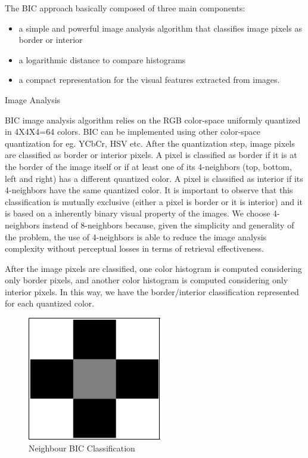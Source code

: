 The BIC approach basically composed of three main components:
\begin{itemize}
\item a simple and powerful image analysis algorithm that classifies image pixels as border or  interior

\item a logarithmic distance to compare histograms

\item a compact representation for the visual features extracted from images.

\end{itemize}
 

Image Analysis

 

BIC image analysis algorithm relies on the RGB color-space uniformly quantized in 4X4X4=64 colors. BIC can be implemented using other color-space quantization for eg. YCbCr, HSV etc. After the quantization step, image pixels are classified as border or interior pixels. A pixel is classified as border if it is at the border of the image itself or if at least one of its 4-neighbors (top, bottom, left and right) has a different quantized color. A pixel is classified as interior if its 4-neighbors have the same quantized color. It is important to observe that this classification is mutually exclusive (either a pixel is border or it is interior) and it is based on a inherently binary visual property of the images. We choose 4-neighbors instead of 8-neighbors because, given the simplicity and generality of the problem, the use of 4-neighbors is able to reduce the image analysis complexity without perceptual losses in terms of retrieval effectiveness.

After the image pixels are classified, one color histogram is computed considering only border pixels, and another color histogram is computed considering only interior pixels. In this way, we have the border/interior classification represented for each quantized color.

\begin{figure}[h]
\centering
  \includegraphics{BIC}
  \caption  {Neighbour BIC Classification}
   \label{BIC}
\end{figure} 

